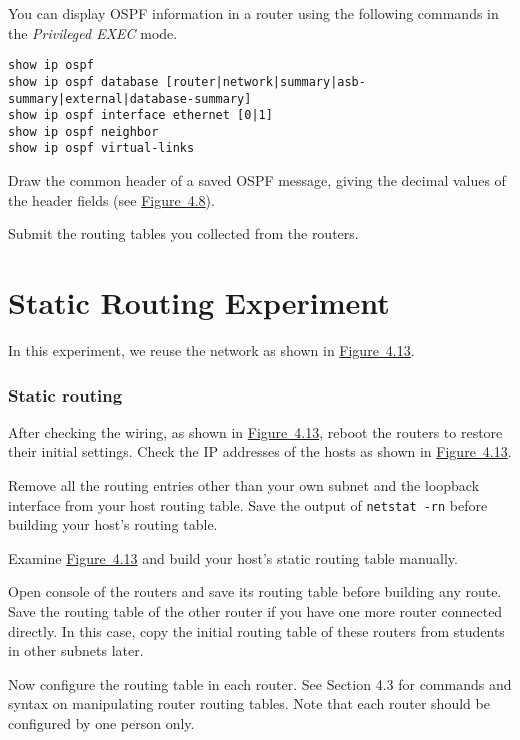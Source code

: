 \documentclass{../UTNetLab}
\begin{document}
    You can display OSPF information in a router using the following commands in the \textit{Privileged EXEC} mode.
    \begin{lstlisting}[language={cisco}]
show ip ospf
show ip ospf database [router|network|summary|asb-summary|external|database-summary]
show ip ospf interface ethernet [0|1]
show ip ospf neighbor
show ip ospf virtual-links
    \end{lstlisting}
    
    \begin{report}
        \item Draw the common header of a saved OSPF message, giving the decimal values of the header fields (see \hyperref[fig:4.8]{Figure~4.8}).
        
        \item Submit the routing tables you collected from the routers.
    \end{report}

\part{Static Routing Experiment}\label{sec:static}
    In this experiment, we reuse the network as shown in \hyperref[fig:4.13]{Figure~4.13}.
\section{Static routing}
    After checking the wiring, as shown in \hyperref[fig:4.13]{Figure~4.13}, reboot the routers to restore their initial settings.
    Check the IP addresses of the hosts as shown in \hyperref[fig:4.13]{Figure~4.13}.

    Remove all the routing entries other than your own subnet and the loopback interface from your host routing table.
    Save the output of \lstinline{netstat -rn} before building your host’s routing table.

    Examine \hyperref[fig:4.13]{Figure~4.13} and build your host’s static routing table manually.

    Open console of the routers and save its routing table before building any route.
    Save the routing table of the other router if you have one more router connected directly.
    In this case, copy the initial routing table of these routers from students in other subnets later.

    Now configure the routing table in each router.
    See Section 4.3 for commands and syntax on manipulating router routing tables.
    Note that each router should be configured by one person only.
\end{document}
